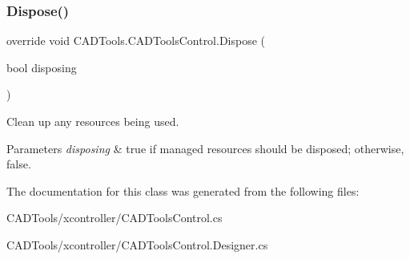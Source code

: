 \subsubsection{\texorpdfstring{Dispose()}{Dispose()}}
{\footnotesize\ttfamily override void C\+A\+D\+Tools.\+C\+A\+D\+Tools\+Control.\+Dispose (\begin{DoxyParamCaption}\item[{bool}]{disposing }\end{DoxyParamCaption})\hspace{0.3cm}{\ttfamily [protected]}}



Clean up any resources being used. 


\begin{DoxyParams}{Parameters}
{\em disposing} & true if managed resources should be disposed; otherwise, false.\\
\hline
\end{DoxyParams}


The documentation for this class was generated from the following files\+:\begin{DoxyCompactItemize}
\item 
C\+A\+D\+Tools/xcontroller/C\+A\+D\+Tools\+Control.\+cs\item 
C\+A\+D\+Tools/xcontroller/C\+A\+D\+Tools\+Control.\+Designer.\+cs\end{DoxyCompactItemize}
